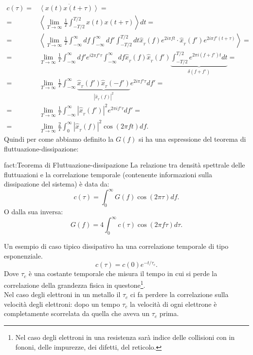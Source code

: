 \[\begin{aligned}
	c( \tau ) 
	=&
		\overline{\left<x( t) x( t+\tau ) \right>}= \\
	=&
		\left<
		\lim_{T \to \infty} \frac{1}{T}
		\int_{-T /2}^{T /2} x( t) x( t + \tau ) 
		\right>dt =\\
	=&
		\left<
		\lim_{T \to \infty} \frac{1}{T}
		\int_{-\infty}^{\infty}df
		\int_{-\infty}^{\infty}df'
		\int_{-T /2}^{T /2}dt
		\hat{x}_{_T} ( f) 
		e^{2i\pi f t}\cdot \hat{x}_{_T} ( f') 
		e^{2i\pi f' \left( t +\tau  \right) }
		\right>=\\
	=&
		\lim_{T \to \infty} \frac{1}{T} 
		\int_{-\infty}^{\infty} df'e^{i 2\pi f'\tau }
		\int_{-\infty}^{\infty}df\hat{x}_{_T}(f)\hat{x}_{_T}(f')
		\underbrace{
			\int_{-T/2}^{T/2}e^{2\pi i \left( f+f' \right)t}dt
		}_{\delta(f+f')}=\\
	=&
		\lim_{T \to \infty} \frac{1}{T}
		\int_{-\infty}^{\infty}
		\underbrace{
		\hat{x}_{_T}( f') \hat{x}_{_T}(-f')
		}_{\left| \hat{x}_{_T}(f) \right|^2}
		e^{2i\pi f' \tau }df'=\\
	=&
		\lim_{T \to \infty} \frac{1}{T}
		\int_{-\infty}^{\infty} 
		\left| \hat{x}_{_T}( f')  \right| ^2 
		e^{2\pi i f'\tau }df' =\\
	=&
		\lim_{T \to \infty} \frac{2}{T}
		\int_{0}^{\infty}
		\left| \hat{x}_{_T}(f) \right|^2 
		\cos(2\pi ft) df 
.\end{aligned}\]
Quindi per come abbiamo definito la $G(f)$ si ha una espressione del teorema di fluttuazione-dissipazione:
\begin{fact}{fact:Teorema di Fluttuazione-dissipazione}
	La relazione tra densità spettrale delle fluttuazioni e la correlazione temporale (contenente informazioni sulla dissipazione del sistema) è data da:
	\[
	c(\tau)=\int_{0}^{\infty} G(f)\cos(2\pi\tau)df  
	.\] 
	O dalla sua inversa:
	\[
	G( f) = 4\int_{0}^{\infty}c(\tau)\cos(2\pi f\tau)d\tau   
	.\]
\end{fact}
Un esempio di caso tipico dissipativo ha una correlazione temporale di tipo esponenziale.
\[
	c( \tau ) = c( 0) e^{- t/\tau _c}
.\] 
Dove $\tau_c$ è una costante temporale che misura il tempo in cui si perde la correlazione della grandezza fisica in questone\footnote{Nel caso degli elettroni in una resistenza sarà indice delle collisioni con in fononi, delle impurezze, dei difetti, del reticolo.}.\\
Nel caso degli elettroni in un metallo il $\tau_c$ ci fa perdere la correlazione sulla velocità degli elettroni: dopo un tempo $\tau_c$ la velocità di ogni elettrone è completamente scorrelata da quella che aveva un $\tau_c$ prima.\\
